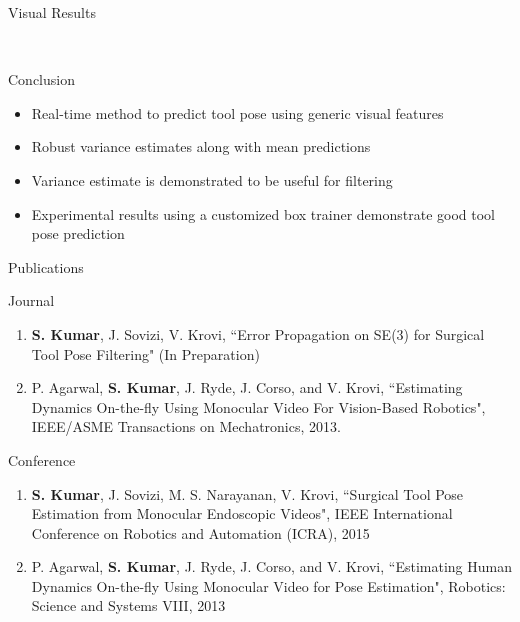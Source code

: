 \begin{frame}{Visual Results}
\begin{figure}
\\
\end{figure}

\end{frame}

\begin{frame}{Conclusion}
\begin{itemize}
\item Real-time method to predict tool pose using generic visual features
\item Robust variance estimates along with mean predictions
\item Variance estimate is demonstrated to be useful for filtering
\item Experimental results using a customized box trainer demonstrate good tool pose prediction 
\end{itemize}
\end{frame}

\begin{frame}{Publications}
\begin{block}{Journal}
\begin{enumerate}
\item \textbf{S. Kumar}, J. Sovizi, V. Krovi, ``Error Propagation on SE(3) for Surgical Tool Pose Filtering" (In Preparation)
\item P. Agarwal, \textbf{S. Kumar}, J. Ryde, J. Corso, and V. Krovi, ``Estimating Dynamics On-the-fly Using Monocular Video For Vision-Based Robotics", IEEE/ASME Transactions on Mechatronics, 2013.
\end{enumerate}
\end{block}

\begin{block}{Conference}
\begin{enumerate}
\item \textbf{S. Kumar}, J. Sovizi, M. S. Narayanan, V. Krovi, ``Surgical Tool Pose Estimation from Monocular Endoscopic Videos", IEEE International Conference on Robotics and Automation (ICRA), 2015
\item P. Agarwal, \textbf{S. Kumar}, J. Ryde, J. Corso, and V. Krovi,
``Estimating Human Dynamics On-the-fly Using Monocular Video for Pose
Estimation", Robotics: Science and Systems VIII, 2013
\end{enumerate}
\end{block}
\end{frame}

